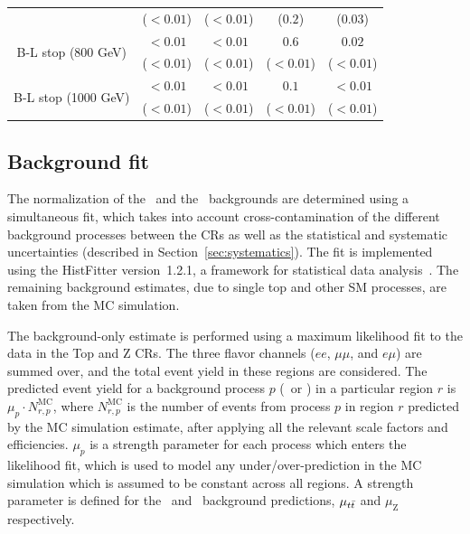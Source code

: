 \begin{table}
{\begin{tabular}{c|cccc}
                                             & ($< 0.01$)                         & ($<0.01$)                          & ($0.2$)                          & ($0.03$) \vspace{1ex} \\
      \multirow{2}{*}{B-L stop (800 GeV)}    & $< 0.01$                           & $< 0.01$                           & $0.6$                            & $0.02$   \\
                                             & ($< 0.01$)                         & ($< 0.01$)                         & ($< 0.01$)                       & ($< 0.01$) \vspace{1ex} \\
      \multirow{2}{*}{B-L stop (1000 GeV)}   & $< 0.01$                           & $< 0.01$                           & $0.1$                            & $< 0.01$                     \\
                                             & ($< 0.01$)                         & ($< 0.01$)                         & ($< 0.01$)                       & ($< 0.01$)
      \vspace{1ex} \\
      \bottomrule
    \end{tabular}

  }
\end{table}

\FloatBarrier
\subsection{Background fit}
\label{sec:bkg_fit}

The normalization of the \TTBAR\ and the \ZGAMMAJETS\ backgrounds are
determined using a simultaneous fit, which takes into account
cross-contamination of the different background processes between the
CRs as well as the statistical and systematic uncertainties (described in
Section~\ref{sec:systematics}).
The fit is implemented using the HistFitter version~1.2.1, a framework for
statistical data analysis~\cite{Baak:2014wma}.
The remaining background estimates, due to  single top and other SM processes,
are taken from the MC simulation.

The background-only estimate is performed using a maximum likelihood fit
to the data in the Top and Z CRs.
The three flavor channels ($ee$, $\mu\mu$, and $e\mu$) are summed over, and the
total event yield in these regions are considered.
The predicted event yield for a background process $p$ (\TTBAR\ or \ZGAMMAJETS)
in a particular region $r$ is $\mu_{p} \cdot N_{r,p}^\mathrm{MC}$, where
$N_{r,p}^\mathrm{MC}$ is the number of events from process $p$ in region $r$
predicted by the MC simulation estimate, after applying all the relevant
scale factors and efficiencies.
$\mu_{p}$ is a strength parameter for each process which enters the likelihood
fit, which is used to model any under/over-prediction in the MC simulation
which is assumed to be constant across all regions.
A strength parameter is defined for the \TTBAR\ and \ZGAMMAJETS\ background
predictions, $\mu_{t\bar{t}}$ and $\mu_\mathrm{Z}$ respectively.

